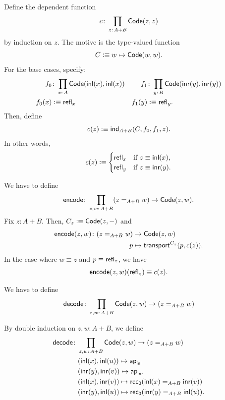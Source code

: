 \begin{description}[font=\normalfont\scshape]
    \item[Base code.] Define the dependent function 
    \[
        c\colon\prod_{z\colon A+B}\fun{Code}(z,z)
    \]
    by induction on $z$. The motive is the type-valued function 
    \[
        C\mathrel{\vcentcolon}\equiv w\mapsto\mathsf{Code}(w,w).
    \]
    For the base cases, specify:
    \begin{align*}
        f_0&\colon\prod_{x\colon A}
            \fun{Code}(\fun{inl}(x),\fun{inl}(x)) 
            &f_1&\colon\prod_{y\colon B}
            \fun{Code}(\fun{inr}(y),\fun{inr}(y))\\
        f_0(x)&\defeq\fun{refl}_x 
            &f_1(y)&\defeq\fun{refl}_y.
    \end{align*}
    Then, define
    \[
        c(z)\mathrel{\vcentcolon}\equiv\mathsf{ind}_{A+B}(C,f_0,f_1,z).
    \]
    In other words,
    \[
        c(z)\mathrel{\vcentcolon}\equiv\begin{cases}
            \mathsf{refl}_x    &\text{if }z\equiv\mathsf{inl}(x),\\
            \mathsf{refl}_y    &\text{if }z\equiv\mathsf{inr}(y).
        \end{cases}
    \]

    \item[Encode function.] We have to define
    \[
        \fun{encode}\colon\prod_{z,w\colon A+B}
            (z\eq{A+B}w)\to\fun{Code}(z,w).
    \]
    Fix $z\colon A+B$. Then, $C_z\mathrel{\vcentcolon}\equiv\mathsf{Code}(z,{\mathord-})$ and
    \begin{align*}
        \fun{encode}(z,w)\colon(z\eq{A+B}w)&\to\fun{Code}(z,w)\\
        p&\mapsto\fun{transport}^{C_z}(p,c(z)).
    \end{align*}
    In the case where $w\equiv z$ and $p\equiv\mathsf{refl}_z$, we have
    \[
        \mathsf{encode}(z,w)(\mathsf{refl}_z)\equiv c(z).
    \]
    
    \item[Decode function.] We have to define
    \[
        \fun{decode}\colon\prod_{z,w\colon A+B}
            \fun{Code}(z,w)\to(z\eq{A+B}w)
    \]

    
    By double induction on $z,w\colon A+B$, we define
    \begin{align*}
        \fun{decode}\colon&\prod_{z,w\colon A+B}\fun{Code}(z,w)
            \to(z\eq{A+B}w)\\
        &(\fun{inl}(x),\fun{inl}(u))
            \mapsto\fun{ap}_{\fun{inl}}\\
        &(\fun{inr}(y),\fun{inr}(v))
            \mapsto\fun{ap}_{\fun{inr}}\\
        &(\fun{inl}(x),\fun{inr}(v))\mapsto
            \fun{rec}_{\fun0}(\fun{inl}(x)\eq{A+B}\fun{inr}(v))\\
        &(\fun{inr}(y),\fun{inl}(u))\mapsto
            \fun{rec}_{\fun0}(\fun{inr}(y)\eq{A+B}\fun{inl}(u)).
    \end{align*}
    

\end{description}
